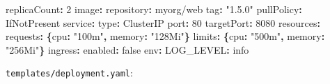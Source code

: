 \documentclass[11pt]{article}
\newenvironment{Shaded}{\begin{snugshade}}{\end{snugshade}}
\newcommand{\AttributeTok}[1]{\textcolor[rgb]{0.16,0.50,0.73}{#1}}
\newcommand{\CharTok}[1]{\textcolor[rgb]{0.24,0.68,0.91}{#1}}
\newcommand{\DecValTok}[1]{\textcolor[rgb]{0.96,0.45,0.00}{#1}}
\newcommand{\FunctionTok}[1]{\textcolor[rgb]{0.56,0.27,0.68}{#1}}
\newcommand{\KeywordTok}[1]{\textcolor[rgb]{0.81,0.81,0.76}{\textbf{#1}}}
\newcommand{\StringTok}[1]{\textcolor[rgb]{0.96,0.31,0.31}{#1}}
\begin{document}
\begin{Shaded}
\begin{Highlighting}[]
\FunctionTok{replicaCount}\KeywordTok{:}\AttributeTok{ }\DecValTok{2}
\FunctionTok{image}\KeywordTok{:}
\AttributeTok{  }\FunctionTok{repository}\KeywordTok{:}\AttributeTok{ myorg/web}
\AttributeTok{  }\FunctionTok{tag}\KeywordTok{:}\AttributeTok{ }\StringTok{"1.5.0"}
\AttributeTok{  }\FunctionTok{pullPolicy}\KeywordTok{:}\AttributeTok{ IfNotPresent}
\FunctionTok{service}\KeywordTok{:}
\AttributeTok{  }\FunctionTok{type}\KeywordTok{:}\AttributeTok{ ClusterIP}
\AttributeTok{  }\FunctionTok{port}\KeywordTok{:}\AttributeTok{ }\DecValTok{80}
\AttributeTok{  }\FunctionTok{targetPort}\KeywordTok{:}\AttributeTok{ }\DecValTok{8080}
\FunctionTok{resources}\KeywordTok{:}
\AttributeTok{  }\FunctionTok{requests}\KeywordTok{:}\AttributeTok{ }\KeywordTok{\{}\FunctionTok{cpu}\KeywordTok{:}\AttributeTok{ }\StringTok{"100m"}\KeywordTok{,}\AttributeTok{ }\FunctionTok{memory}\KeywordTok{:}\AttributeTok{ }\StringTok{"128Mi"}\KeywordTok{\}}
\AttributeTok{  }\FunctionTok{limits}\KeywordTok{:}\AttributeTok{   }\KeywordTok{\{}\FunctionTok{cpu}\KeywordTok{:}\AttributeTok{ }\StringTok{"500m"}\KeywordTok{,}\AttributeTok{ }\FunctionTok{memory}\KeywordTok{:}\AttributeTok{ }\StringTok{"256Mi"}\KeywordTok{\}}
\FunctionTok{ingress}\KeywordTok{:}
\AttributeTok{  }\FunctionTok{enabled}\KeywordTok{:}\AttributeTok{ }\CharTok{false}
\FunctionTok{env}\KeywordTok{:}
\AttributeTok{  }\FunctionTok{LOG\_LEVEL}\KeywordTok{:}\AttributeTok{ info}
\end{Highlighting}
\end{Shaded}

\texttt{templates/deployment.yaml}:

\end{document}
